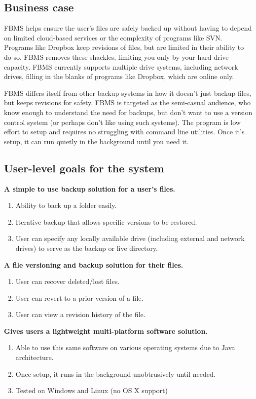 \documentclass[12pt,a4paper]{article}
\begin{document}
\subsection{Business case}
FBMS helps ensure the user's files are safely backed up without having to depend on limited cloud-based services or the complexity of programs like SVN\cite{svn}. Programs like Dropbox\cite{dropbox} keep revisions of files, but are limited in their ability to do so. FBMS removes these shackles, limiting you only by your hard drive capacity. FBMS currently supports multiple drive systems, including network drives, filling in the blanks of programs like Dropbox, which are online only.

FBMS differs itself from other backup systems in how it doesn't just backup files, but keeps revisions for safety. FBMS is targeted as the semi-casual audience, who know enough to understand the need for backups, but don't want to use a version control system (or perhaps don't like using such systems). The program is low effort to setup and requires no struggling with command line utilities. Once it's setup, it can run quietly in the background until you need it.

\subsection{User-level goals for the system}
\textbf{A simple to use backup solution for a user's files.}
\begin{enumerate}
\item Ability to back up a folder easily.
\item Iterative backup that allows specific versions to be restored.
\item User can specify any locally available drive (including external and network drives) to serve as the backup or live directory.
\end{enumerate}

\textbf{A file versioning and backup solution for their files.}
\begin{enumerate}
\item User can recover deleted/lost files.
\item User can revert to a prior version of a file.
\item User can view a revision history of the file.
\end{enumerate}

\textbf{Gives users a lightweight multi-platform software solution.}
\begin{enumerate}
\item Able to use this same software on various operating systems due to Java architecture.
\item Once setup, it runs in the background unobtrusively until needed.
\item Tested on Windows and Linux (no OS X support)
\end{enumerate}
\end{document}

